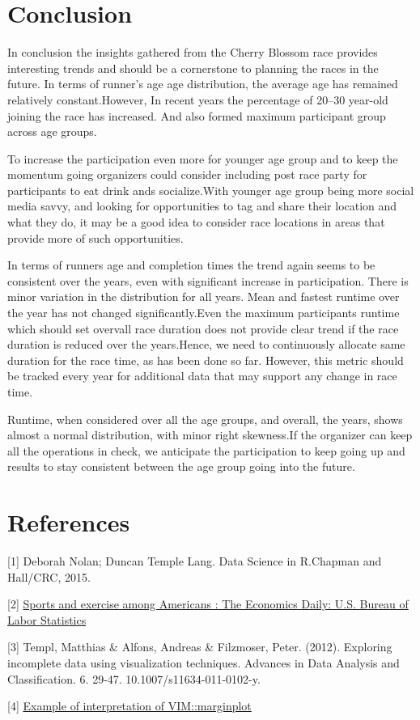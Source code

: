 \documentclass[
]{article}
\begin{document}
\newpage

\hypertarget{conclusion}{%
\section{Conclusion}\label{conclusion}}

In conclusion the insights gathered from the Cherry Blossom race
provides interesting trends and should be a cornerstone to planning the
races in the future. In terms of runner's age age distribution, the
average age has remained relatively constant.However, In recent years
the percentage of 20--30 year-old joining the race has increased. And
also formed maximum participant group across age groups.

To increase the participation even more for younger age group and to
keep the momentum going organizers could consider including post race
party for participants to eat drink ands socialize.With younger age
group being more social media savvy, and looking for opportunities to
tag and share their location and what they do, it may be a good idea to
consider race locations in areas that provide more of such
opportunities.

In terms of runners age and completion times the trend again seems to be
consistent over the years, even with significant increase in
participation. There is minor variation in the distribution for all
years. Mean and fastest runtime over the year has not changed
significantly.Even the maximum participants runtime which should set
overvall race duration does not provide clear trend if the race duration
is reduced over the years.Hence, we need to continuously allocate same
duration for the race time, as has been done so far. However, this
metric should be tracked every year for additional data that may support
any change in race time.

Runtime, when considered over all the age groups, and overall, the
years, shows almost a normal distribution, with minor right skewness.If
the organizer can keep all the operations in check, we anticipate the
participation to keep going up and results to stay consistent between
the age group going into the future.

\hypertarget{references}{%
\section*{References}\label{references}}

{[}1{]} Deborah Nolan; Duncan Temple Lang. Data Science in R.Chapman and
Hall/CRC, 2015.

{[}2{]}
\href{https://www.bls.gov/opub/ted/2016/sports-and-exercise-among-americans.htm}{Sports
and exercise among Americans : The Economics Daily: U.S. Bureau of Labor
Statistics}

{[}3{]} Templ, Matthias \& Alfons, Andreas \& Filzmoser, Peter. (2012).
Exploring incomplete data using visualization techniques. Advances in
Data Analysis and Classification. 6. 29-47. 10.1007/s11634-011-0102-y.

{[}4{]}
\href{https://boostedml.com/2020/05/visualizing-missing-data-in-r-the-basics-with-vim.html\#The_Margin_Plot_Checking_Missing_Completely_at_Random_MCAR}{Example
of interpretation of VIM::marginplot}
\end{document}
